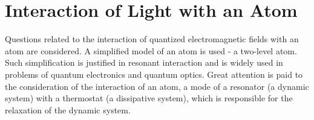 \chapter{Interaction of Light with an Atom}
\label{chInteraction}

Questions related to the interaction of quantized electromagnetic fields with an atom are considered. A simplified model of an atom is used - a two-level atom. Such simplification is justified in resonant interaction and is widely used in problems of quantum electronics and quantum optics. Great attention is paid to the consideration of the interaction of an atom, a mode of a resonator (a dynamic system) with a thermostat (a dissipative system), which is responsible for the relaxation of the dynamic system.

















